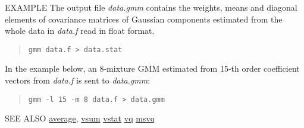 \begin{qsection}{EXAMPLE}
The output file {\em data.gmm} contains the weights, means and diagonal elements of covariance matrices 
of Gaussian components estimated from the whole data in {\em data.f} read in float format.
\begin{quote}
  \verb!gmm data.f > data.stat!
\end{quote}

In the example below, an 8-mixture GMM estimated from 15-th order coefficient vectors from
{\em data.f} is sent to {\em data.gmm}:
\begin{quote}
  \verb!gmm -l 15 -m 8 data.f > data.gmm!
\end{quote}
\end{qsection}

\begin{qsection}{SEE ALSO}
\hyperlink{average}{average},
\hyperlink{vsum}{vsum}
\hyperlink{vstat}{vstat}
\hyperlink{vq}{vq}
\hyperlink{msvq}{msvq}
\end{qsection}
